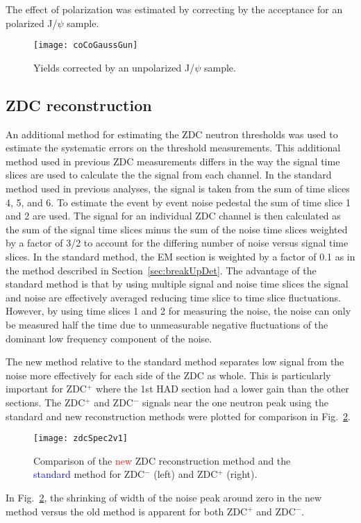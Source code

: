       The effect of polarization was estimated by correcting by the acceptance
        for an polarized J/$\psi$ sample.
      \begin{figure}[!Hhtb]
        \centering
        \texttt{[image: coCoGaussGun]}
        \caption{Yields corrected by an unpolarized J/$\psi$ sample.}
        \label{fig:coYieldGaussCor}
      \end{figure}

    \subsection{ZDC reconstruction}
      An additional method for estimating the ZDC neutron thresholds was used
        to estimate the systematic errors on the threshold measurements.  
      This additional method used in previous ZDC measurements differs 
        in the way the signal time slices are used to calculate the 
        the signal from each channel.
      In the standard method used in previous analyses, the signal is
        taken from the sum of time slices 4, 5, and 6.
      To estimate the event by event noise pedestal the sum of time slice 
        1 and 2 are used. 
      The signal for an individual ZDC channel is then calculated as the 
        sum of the signal time slices minus the sum of the noise time slices
        weighted by a factor of 3/2 to account for the differing number of 
        noise versus signal time slices.
      In the standard method, the EM section is weighted by a factor of 0.1 
        as in the method described in Section~\ref{sec:breakUpDet}.
      The advantage of the standard method is that by using multiple signal
        and noise time slices the signal and noise are effectively averaged
        reducing time slice to time slice fluctuations.
      However, by using time slices 1 and 2 for measuring the noise, the noise
        can only be measured half the time due to unmeasurable negative 
        fluctuations of the dominant low frequency component of the noise.

      The new method relative to the standard method separates low signal from 
        the noise more effectively for each side of the ZDC as whole.
      This is particularly important for ZDC$^{+}$ where the 1st HAD section
        had a lower gain than the other sections. 
      The ZDC$^{+}$ and ZDC$^{-}$ signals near the one neutron peak using the
        standard and new reconstruction methods were plotted for comparison in 
        Fig.~\ref{fig:zdcSpec2v1}.
      \begin{figure}[h]
        \centering
        \texttt{[image: zdcSpec2v1]}
        \caption{Comparison of the \textcolor{red}{new} ZDC reconstruction 
          method and the \textcolor{blue}{standard} method for ZDC$^{-}$ (left) and 
          ZDC$^{+}$ (right).}
        \label{fig:zdcSpec2v1}
      \end{figure}
      In Fig.~\ref{fig:zdcSpec2v1}, the shrinking of width of the noise peak 
        around zero in the new method versus the old method is apparent for
        both ZDC$^{+}$ and ZDC$^{-}$.

